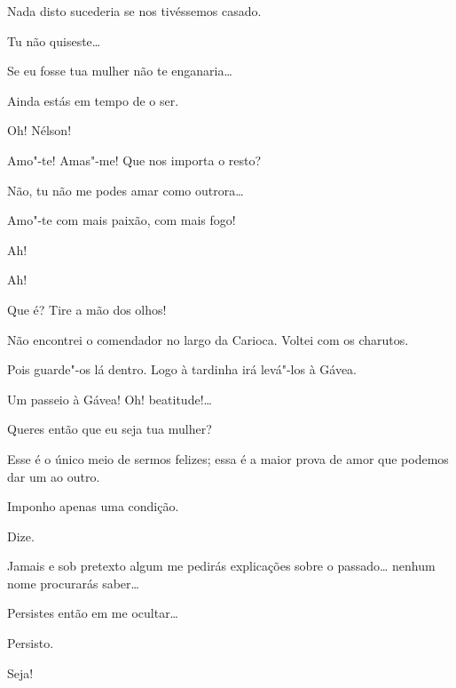 {  
Nada disto sucederia se nos tivéssemos casado.

  Tu não quiseste\ldots{}

  Se eu fosse tua mulher não te enganaria\ldots{}

  Ainda estás em tempo de o ser.

  Oh! Nélson!

  Amo"-te! Amas"-me! Que nos importa o resto?

  Não, tu não me podes amar como outrora\ldots{}

  Amo"-te com mais paixão, com mais fogo!


  Ah!

  Ah!

  Que é? Tire
a mão dos olhos!

  Não encontrei o comendador no largo da Carioca. Voltei
com os charutos.

  Pois guarde"-os lá dentro. Logo à tardinha irá
levá"-los à Gávea.

   Um passeio à Gávea! Oh! beatitude!\ldots{} 

  Queres então que eu seja tua mulher?

  Esse é o único meio de sermos felizes; essa é
a maior prova de amor que podemos dar um ao outro.

  Imponho apenas uma condição.

  Dize.

  Jamais e sob pretexto algum me pedirás
explicações sobre o passado\ldots{} nenhum nome procurarás saber\ldots{}

  Persistes então em me ocultar\ldots{}

  Persisto.

  Seja!


}
